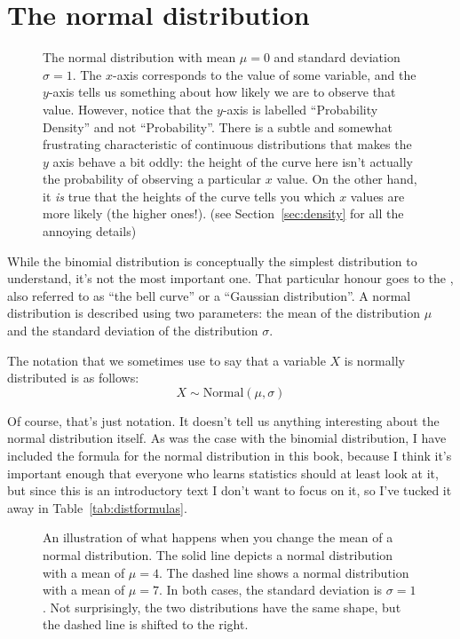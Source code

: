 \section{The normal distribution\label{sec:normal}}

\begin{figure}[t]
\begin{center}
\caption{The normal distribution with mean $\mu = 0$ and standard deviation $\sigma = 1$. The $x$-axis corresponds to the value of some variable, and the $y$-axis tells us something about how likely we are to observe that value. However, notice that the $y$-axis is labelled ``Probability Density'' and not ``Probability''. There is a subtle and somewhat frustrating characteristic of continuous distributions that makes the $y$ axis behave a bit oddly: the height of the curve here isn't actually the probability of observing a particular $x$ value. On the other hand, it {\it is} true that the heights of the curve tells you which $x$ values are more likely (the higher ones!). (see Section~\ref{sec:density} for all the annoying details)}
\label{fig:normdist}
\end{center}
\end{figure}

While the binomial distribution is conceptually the simplest distribution to understand, it's not the most important one. That particular honour goes to the , also referred to as ``the bell curve'' or a ``Gaussian distribution''. A normal distribution is described using two parameters: the mean of the distribution $\mu$ and the standard deviation of the distribution $\sigma$. 

The notation that we sometimes use to say that a variable $X$ is normally distributed is as follows:
$$
X \sim \mbox{Normal}(\mu,\sigma)
$$

Of course, that's just notation. It doesn't tell us anything interesting about the normal distribution itself. As was the case with the binomial distribution, I have included the formula for the normal distribution in this book, because I think it's important enough that everyone who learns statistics should at least look at it, but since this is an introductory text I don't want to focus on it, so I've tucked it away in Table~\ref{tab:distformulas}. 

\begin{figure}[t]
\begin{center}
\caption{An illustration of what happens when you change the mean of a normal distribution. The solid line depicts a normal distribution with a mean of $\mu=4$. The dashed line shows a normal distribution with a mean of $\mu=7$. In both cases, the standard deviation is $\sigma=1$. Not surprisingly, the two distributions have the same shape, but the dashed line is shifted to the right.}
\label{fig:normmean}
\end{center}
\end{figure}

